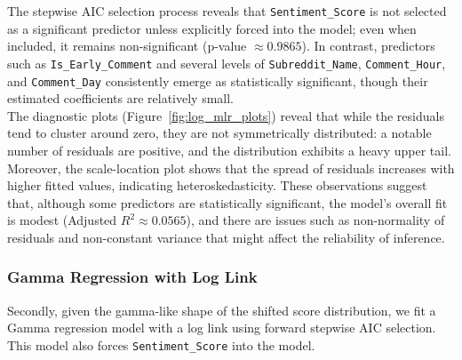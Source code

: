 \documentclass[10pt]{article}
\begin{document}
\noindent The stepwise AIC selection process reveals that \texttt{Sentiment\_Score} is not selected as a significant predictor unless explicitly forced into the model; even when included, it remains non-significant (p-value \(\approx 0.9865\)). In contrast, predictors such as \texttt{Is\_Early\_Comment} and several levels of \texttt{Subreddit\_Name}, \texttt{Comment\_Hour}, and \texttt{Comment\_Day} consistently emerge as statistically significant, though their estimated coefficients are relatively small. \\

\noindent The diagnostic plots (Figure~\ref{fig:log_mlr_plots}) reveal that while the residuals tend to cluster around zero, they are not symmetrically distributed: a notable number of residuals are positive, and the distribution exhibits a heavy upper tail. Moreover, the scale-location plot shows that the spread of residuals increases with higher fitted values, indicating heteroskedasticity. These observations suggest that, although some predictors are statistically significant, the model's overall fit is modest (Adjusted \(R^2 \approx 0.0565\)), and there are issues such as non-normality of residuals and non-constant variance that might affect the reliability of inference.

\subsubsection{Gamma Regression with Log Link}
Secondly, given the gamma-like shape of the shifted score distribution, we fit a Gamma regression model with a log link using forward stepwise AIC selection. This model also forces \texttt{Sentiment\_Score} into the model.
\end{document}

